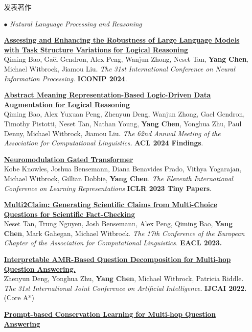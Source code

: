 \documentclass{resume} %
\begin{document}
\begin{rSection}{发表著作}
\begin{rSubsection}{\large\em $\bullet$ Natural Language Processing and Reasoning}{}{}{}
	\item {\href{https://arxiv.org/abs/2310.09430}{\bf Assessing and Enhancing the Robustness of Large Language Models with Task Structure Variations for Logical Reasoning}}\\ {Qiming Bao, Ga\"el Gendron, Alex Peng, Wanjun Zhong, Neset Tan, {\bf Yang Chen}, Michael Witbrock, Jiamou Liu.}
{\em The 31st International Conference on Neural Information Processing.} {\bf ICONIP 2024}.
	\item {\href{https://arxiv.org/abs/2305.12599}{\bf Abstract Meaning Representation-Based Logic-Driven Data Augmentation for Logical Reasoning}}\\ {Qiming Bao, Alex Yuxuan Peng, Zhenyun Deng, Wanjun Zhong, Gael Gendron, Timothy Pistotti, Neset Tan, Nathan Young, {\bf Yang Chen}, Yonghua Zhu, Paul Denny, Michael Witbrock, Jiamou Liu.}
{\em The 62nd Annual Meeting of the Association for Computational Linguistics.} {\bf ACL 2024 Findings}.
	\item {\href{https://arxiv.org/abs/2305.03232}{\bf Neuromodulation Gated Transformer}}\\
Kobe Knowles, Joshua Bensemann, Diana Benavides Prado, Vithya Yogarajan, Michael Witbrock, Gillian Dobbie, \textbf{Yang Chen}. {\em The Eleventh International Conference on Learning Representations} {\bf ICLR 2023 Tiny Papers}.\\
	\item {\href{https://aclanthology.org/2023.eacl-main.194.pdf}{\bf Multi2Claim: Generating Scientific Claims from Multi-Choice Questions for Scientific Fact-Checking}}\\
Neset Tan, Trung Nguyen, Josh Bensemann, Alex Peng, Qiming Bao, \textbf{Yang Chen}, Mark Gahegan, Michael Witbrock. {\em The 17th Conference of the European Chapter of the Association for Computational Linguistics.} {\bf EACL 2023.}\\
	\item {\href{https://www.ijcai.org/proceedings/2022/0568.pdf}{\bf Interpretable AMR-Based Question Decomposition for Multi-hop Question Answering.}}\\
		Zhenyun Deng, Yonghua Zhu, \textbf{Yang Chen}, Michael Witbrock, Patricia Riddle. {\em The 31st International Joint Conference on Artificial Intelligence.} \textbf{IJCAI 2022.} (Core A*)\\
	\item {\href{https://aclanthology.org/2022.coling-1.154.pdf}{\bf Prompt-based Conservation  Learning for Multi-hop Question Answering}}\\

\end{rSubsection}
\end{rSection}
\end{document}
